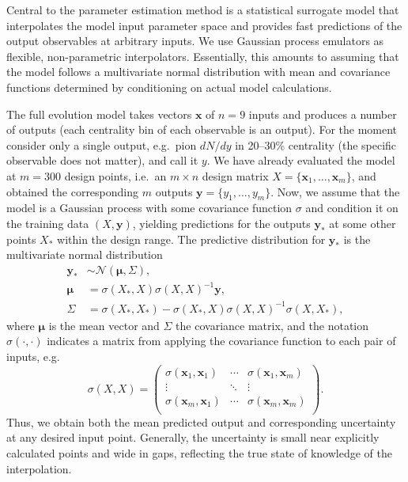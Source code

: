 \documentclass[aps,prc,reprint,amsmath,nofootinbib]{revtex4-1}
\begin{document}
\newcommand{\x}{\mathbf x}
\newcommand{\y}{\mathbf y}
\newcommand{\N}{\mathcal N}
\newcommand{\muvec}{\boldsymbol\mu}
\newcommand{\tran}{^\intercal}

Central to the parameter estimation method is a statistical surrogate model that interpolates the model input parameter space and provides fast predictions of the output observables at arbitrary inputs.
We use Gaussian process emulators \cite{Rasmussen:2006gp} as flexible, non-parametric interpolators.
Essentially, this amounts to assuming that the model follows a multivariate normal distribution with mean and covariance functions determined by conditioning on actual model calculations.

The full evolution model takes vectors $\x$ of $n = 9$ inputs and produces a number of outputs (each centrality bin of each observable is an output).
For the moment consider only a single output, e.g.\ pion $dN/dy$ in \mbox{20--30\%} centrality (the specific observable does not matter), and call it $y$.
We have already evaluated the model at $m = 300$ design points, i.e.\ an $m \times n$ design matrix $X = \{\x_1, \ldots, \x_m\}$, and obtained the corresponding $m$ outputs $\y = \{y_1, \ldots, y_m\}$.
Now, we assume that the model is a Gaussian process with some covariance function $\sigma$ and condition it on the training data $(X, \y)$, yielding predictions for the outputs $\y_*$ at some other points $X_*$ within the design range.
The predictive distribution for $\y_*$ is the multivariate normal distribution
\begin{equation}
  \begin{aligned}
    \y_* &\sim \N(\muvec, \Sigma), \\
    \muvec &= \sigma(X_*, X)\sigma(X, X)^{-1}\y, \\
    \Sigma &= \sigma(X_*,X_*) - \sigma(X_*,X)\sigma(X,X)^{-1}\sigma(X,X_*),
  \end{aligned}
\end{equation}
where $\muvec$ is the mean vector and $\Sigma$ the covariance matrix, and the notation $\sigma(\cdot, \cdot)$ indicates a matrix from applying the covariance function to each pair of inputs, e.g.
\begin{equation}
  \sigma(X, X) =
  \begin{pmatrix}
    \sigma(\x_1, \x_1) & \cdots & \sigma(\x_1, \x_m) \\
    \vdots & \ddots & \vdots \\
    \sigma(\x_m, \x_1) & \cdots & \sigma(\x_m, \x_m) \\
  \end{pmatrix}.
\end{equation}
Thus, we obtain both the mean predicted output and corresponding uncertainty at any desired input point.
Generally, the uncertainty is small near explicitly calculated points and wide in gaps, reflecting the true state of knowledge of the interpolation.
\end{document}
